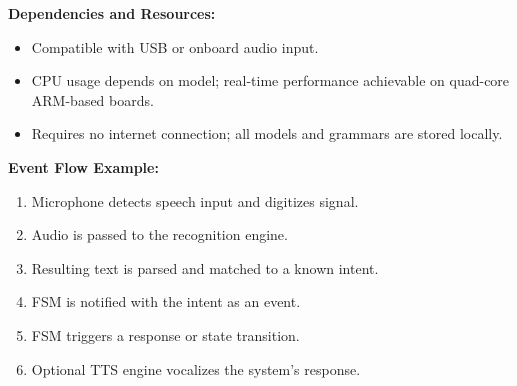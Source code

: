 \vspace{0.5cm}

\noindent\textbf{Dependencies and Resources:}
\begin{itemize}
    \item Compatible with USB or onboard audio input.
    \item CPU usage depends on model; real-time performance achievable on quad-core ARM-based boards.
    \item Requires no internet connection; all models and grammars are stored locally.
\end{itemize}

\vspace{0.5cm}

\noindent\textbf{Event Flow Example:}
\begin{enumerate}
    \item Microphone detects speech input and digitizes signal.
    \item Audio is passed to the recognition engine.
    \item Resulting text is parsed and matched to a known intent.
    \item FSM is notified with the intent as an event.
    \item FSM triggers a response or state transition.
    \item Optional TTS engine vocalizes the system’s response.
\end{enumerate}
